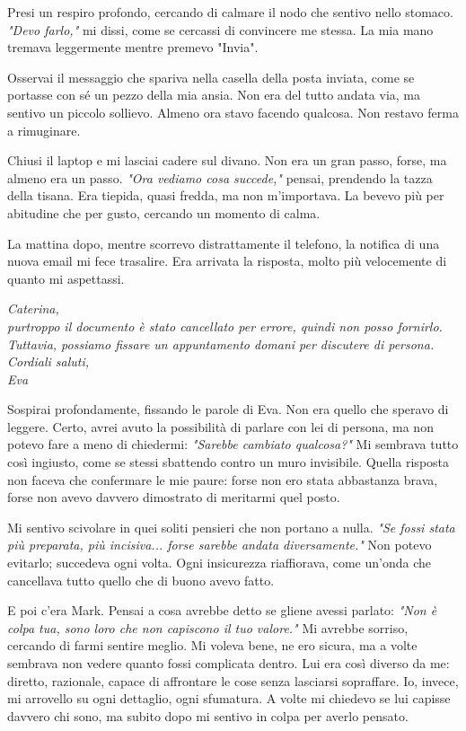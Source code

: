 Presi un respiro profondo, cercando di calmare il nodo che sentivo nello stomaco. \emph{"Devo farlo,"} mi dissi, come se cercassi di convincere me stessa. La mia mano tremava leggermente mentre premevo "Invia".

Osservai il messaggio che spariva nella casella della posta inviata, come se portasse con sé un pezzo della mia ansia. Non era del tutto andata via, ma sentivo un piccolo sollievo. Almeno ora stavo facendo qualcosa. Non restavo ferma a rimuginare.

Chiusi il laptop e mi lasciai cadere sul divano. Non era un gran passo, forse, ma almeno era un passo. \emph{"Ora vediamo cosa succede,"} pensai, prendendo la tazza della tisana. Era tiepida, quasi fredda, ma non m'importava. La bevevo più per abitudine che per gusto, cercando un momento di calma.

La mattina dopo, mentre scorrevo distrattamente il telefono, la notifica di una nuova email mi fece trasalire. Era arrivata la risposta, molto più velocemente di quanto mi aspettassi.

\begin{tcolorbox}[colback=white!95!red!5, colframe=red!75!black, title=\textbf{Risposta di Eva a Caterina}, fonttitle=\bfseries]
\emph{Caterina,\\
purtroppo il documento è stato cancellato per errore, quindi non posso fornirlo. Tuttavia, possiamo fissare un appuntamento domani per discutere di persona.\\
Cordiali saluti,\\
Eva}
\end{tcolorbox}
Sospirai profondamente, fissando le parole di Eva. Non era quello che speravo di leggere. Certo, avrei avuto la possibilità di parlare con lei di persona, ma non potevo fare a meno di chiedermi: \emph{"Sarebbe cambiato qualcosa?"} Mi sembrava tutto così ingiusto, come se stessi sbattendo contro un muro invisibile. Quella risposta non faceva che confermare le mie paure: forse non ero stata abbastanza brava, forse non avevo davvero dimostrato di meritarmi quel posto.

Mi sentivo scivolare in quei soliti pensieri che non portano a nulla. \emph{"Se fossi stata più preparata, più incisiva... forse sarebbe andata diversamente."} Non potevo evitarlo; succedeva ogni volta. Ogni insicurezza riaffiorava, come un'onda che cancellava tutto quello che di buono avevo fatto.

E poi c'era Mark. Pensai a cosa avrebbe detto se gliene avessi parlato: \emph{"Non è colpa tua, sono loro che non capiscono il tuo valore."} Mi avrebbe sorriso, cercando di farmi sentire meglio. Mi voleva bene, ne ero sicura, ma a volte sembrava non vedere quanto fossi complicata dentro. Lui era così diverso da me: diretto, razionale, capace di affrontare le cose senza lasciarsi sopraffare. Io, invece, mi arrovello su ogni dettaglio, ogni sfumatura. A volte mi chiedevo se lui capisse davvero chi sono, ma subito dopo mi sentivo in colpa per averlo pensato.


